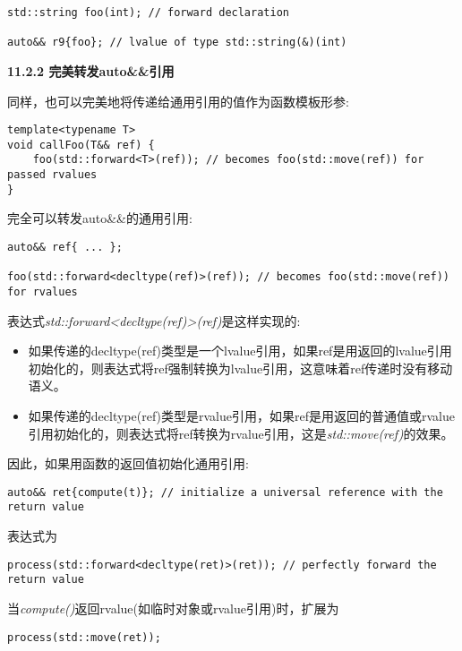 \begin{lstlisting}[caption={}]
std::string foo(int); // forward declaration

auto&& r9{foo}; // lvalue of type std::string(&)(int)
\end{lstlisting}

\hspace*{\fill} \par %
\textbf{11.2.2 完美转发auto\&\&引用}

同样，也可以完美地将传递给通用引用的值作为函数模板形参:\par

\begin{lstlisting}[caption={}]
template<typename T>
void callFoo(T&& ref) {
	foo(std::forward<T>(ref)); // becomes foo(std::move(ref)) for passed rvalues
}
\end{lstlisting}

完全可以转发auto\&\&的通用引用:\par

\begin{lstlisting}[caption={}]
auto&& ref{ ... };

foo(std::forward<decltype(ref)>(ref)); // becomes foo(std::move(ref)) for rvalues
\end{lstlisting}

表达式\textit{std::forward<decltype(ref)>(ref)}是这样实现的:\par

\begin{itemize}
	\item 如果传递的decltype(ref)类型是一个lvalue引用，如果ref是用返回的lvalue引用初始化的，则表达式将ref强制转换为lvalue引用，这意味着ref传递时没有移动语义。
	\item 如果传递的decltype(ref)类型是rvalue引用，如果ref是用返回的普通值或rvalue引用初始化的，则表达式将ref转换为rvalue引用，这是\textit{std::move(ref)}的效果。
\end{itemize}

因此，如果用函数的返回值初始化通用引用:\par

\begin{lstlisting}[caption={}]
auto&& ret{compute(t)}; // initialize a universal reference with the return value
\end{lstlisting}

表达式为\par

\begin{lstlisting}[caption={}]
process(std::forward<decltype(ret)>(ret)); // perfectly forward the return value
\end{lstlisting}

当\textit{compute()}返回rvalue(如临时对象或rvalue引用)时，扩展为\par

\begin{lstlisting}[caption={}]
process(std::move(ret));
\end{lstlisting}
























